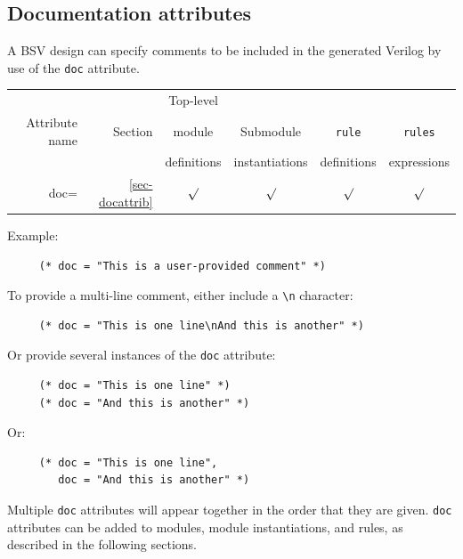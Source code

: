 \documentclass[twoside,letterpaper]{article}
\newcommand{\hm}{\hspace*{1em}}
\newcommand{\te}[1]{\texttt{#1}}
\newcommand{\nterm}[1]{\emph{#1}}
\newcommand{\term}[1]{\texttt{#1}}
\newcommand{\opt}[1]{[ #1 ]}
\newcommand{\gram}[2]{    \hm\makebox[10em][l]{\it #1}\makebox[1.5em][l]{::=}    #2}
\begin{document}
 


\subsection{Documentation attributes}

\index{doc=@\te{doc=} (attribute)}
\label{sec-docattrib}


A BSV design can specify comments to be included in the generated Verilog
by use of the \te{doc} attribute.





\begin{center}
\begin{tabular}{|r|r|c|c|c|c|}
\hline
&  &Top-level                &          && \\
Attribute name &Section&module &Submodule   &\te{rule}&\te{rules} \\
& &definitions &instantiations &definitions &expressions  \\
\hline 
\hline

doc= &\ref{sec-docattrib} &$\surd$ &$\surd$ &$\surd$& $\surd$\\
\hline
\end{tabular}
\end{center}


Example:
\begin{verbatim}
     (* doc = "This is a user-provided comment" *)
\end{verbatim}
To provide a multi-line comment, either include a \verb|\n| character:
\begin{verbatim}
     (* doc = "This is one line\nAnd this is another" *)
\end{verbatim}
Or provide several instances of the \te{doc} attribute:
\begin{verbatim}
     (* doc = "This is one line" *)
     (* doc = "And this is another" *)
\end{verbatim}
Or:
\begin{verbatim}
     (* doc = "This is one line",
        doc = "And this is another" *)
\end{verbatim}
Multiple \te{doc} attributes will appear together in the order that they
are given. \te{doc} attributes can be added to modules, module
instantiations, and rules, as described in the following sections.
\end{document}
